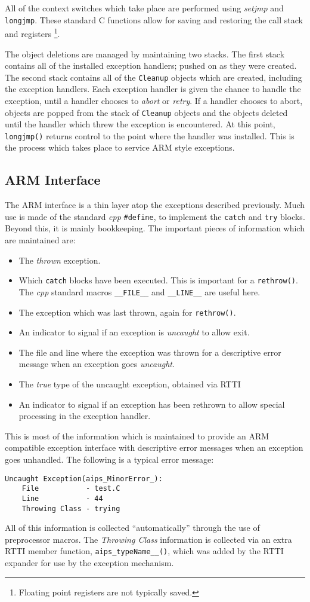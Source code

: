 All of the context switches which take place are performed using {\em setjmp}
and {\tt longjmp}. These standard C functions allow for saving and restoring
the call stack and registers \footnote{Floating point registers are not
typically saved.}. 

The object deletions are managed by maintaining two stacks. The first stack
contains all of the installed exception handlers; pushed on as they were 
created. The second stack contains all of the {\tt Cleanup} objects which 
are created, including the exception handlers. Each exception handler is 
given the chance to handle the exception, until a handler chooses to 
{\em abort} or {\em retry}. If a handler chooses to abort, objects are
popped from the stack of {\tt Cleanup} objects and the objects deleted 
until the handler which threw the exception is encountered. At this point, 
{\tt longjmp()} returns control to the point where the handler was 
installed. This is the process which takes place to service ARM style 
exceptions.

\subsection{ARM Interface}

The ARM interface is a thin layer atop the exceptions described previously.
Much use is made of the standard {\em cpp} {\tt \#define}, to implement
the {\tt catch} and {\tt try} blocks. Beyond this, it is mainly bookkeeping.
The important pieces of information which are maintained are:
\begin{itemize}
\item
The {\em thrown} exception.
\item
Which {\tt catch} blocks have been executed. This is important for a
{\tt rethrow()}. The {\em cpp} standard macros {\tt \_\_FILE\_\_} and
{\tt \_\_LINE\_\_} are useful here.
\item
The exception which was last thrown, again for {\tt rethrow()}.
\item
An indicator to signal if an exception is {\em uncaught} to allow exit.
\item
The file and line where the exception was thrown for a descriptive error
message when an exception goes {\em uncaught}.
\item
The {\em true} type of the uncaught exception, obtained via RTTI
\item
An indicator to signal if an exception has been rethrown to allow special
processing in the exception handler.
\end{itemize}
\noindent
This is most of the information which is maintained to provide an
ARM compatible exception interface with descriptive error messages when
an exception goes unhandled. The following is a typical error message:
\begin{verbatim}
Uncaught Exception(aips_MinorError_):
    File           - test.C
    Line           - 44
    Throwing Class - trying
\end{verbatim}
\noindent
All of this information is collected ``automatically'' through the use
of preprocessor macros. The {\em Throwing Class} information is collected
via an extra RTTI member function, {\tt aips\_typeName\_\_()}, which was
added by the RTTI expander for use by the exception mechanism.

